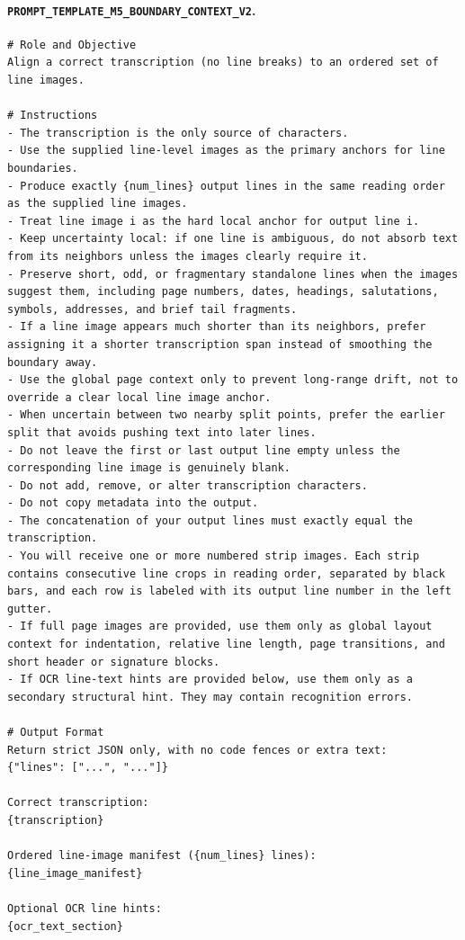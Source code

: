 \paragraph{\texttt{PROMPT\_TEMPLATE\_M5\_BOUNDARY\_CONTEXT\_V2}.}
\begin{lstlisting}[basicstyle=\scriptsize\ttfamily,breaklines=true,columns=fullflexible]
# Role and Objective
Align a correct transcription (no line breaks) to an ordered set of line images.

# Instructions
- The transcription is the only source of characters.
- Use the supplied line-level images as the primary anchors for line boundaries.
- Produce exactly {num_lines} output lines in the same reading order as the supplied line images.
- Treat line image i as the hard local anchor for output line i.
- Keep uncertainty local: if one line is ambiguous, do not absorb text from its neighbors unless the images clearly require it.
- Preserve short, odd, or fragmentary standalone lines when the images suggest them, including page numbers, dates, headings, salutations, symbols, addresses, and brief tail fragments.
- If a line image appears much shorter than its neighbors, prefer assigning it a shorter transcription span instead of smoothing the boundary away.
- Use the global page context only to prevent long-range drift, not to override a clear local line image anchor.
- When uncertain between two nearby split points, prefer the earlier split that avoids pushing text into later lines.
- Do not leave the first or last output line empty unless the corresponding line image is genuinely blank.
- Do not add, remove, or alter transcription characters.
- Do not copy metadata into the output.
- The concatenation of your output lines must exactly equal the transcription.
- You will receive one or more numbered strip images. Each strip contains consecutive line crops in reading order, separated by black bars, and each row is labeled with its output line number in the left gutter.
- If full page images are provided, use them only as global layout context for indentation, relative line length, page transitions, and short header or signature blocks.
- If OCR line-text hints are provided below, use them only as a secondary structural hint. They may contain recognition errors.

# Output Format
Return strict JSON only, with no code fences or extra text:
{"lines": ["...", "..."]}

Correct transcription:
{transcription}

Ordered line-image manifest ({num_lines} lines):
{line_image_manifest}

Optional OCR line hints:
{ocr_text_section}
\end{lstlisting}

